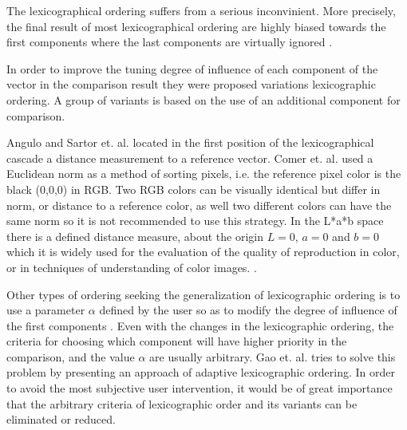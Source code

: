 
The lexicographical ordering suffers from a serious inconvinient. More precisely, the final result of most lexicographical ordering are highly biased towards the first components where the last components are virtually ignored \cite{hanbury2002mathematical3}.
 
In order to improve the tuning degree of influence of each component of the vector in the comparison result they were proposed variations lexicographic ordering. A group of variants is based on the use of an additional component for comparison.

Angulo \cite{angulo2005morphological} and  Sartor et. al. \cite{sartor2001morphological} located in the first position of the lexicographical cascade a distance measurement to a reference vector. Comer et. al. \cite{comer1999morphological} used a Euclidean norm as a method of sorting pixels, i.e. the reference pixel color is the black (0,0,0) in RGB. Two RGB colors can be visually identical but differ in norm, or distance to a reference color, as well two different colors can have the same norm so it is not recommended to use this strategy. In the L*a*b space there is a defined distance measure, about the origin $L=0$, $a=0$ and $b=0$ which it is widely used for the evaluation of the quality of reproduction in color, or in techniques of understanding of color images. \cite{tremeau1998analyse}.   

Other types of ordering seeking the generalization of lexicographic ordering is to use a parameter $\alpha$  defined by the user so as to modify the degree of influence of the first components \cite{ortiz2002procesamiento,angulo2005unified}. Even with the changes in the lexicographic ordering, the criteria for choosing which component will have higher priority in the comparison, and the value $\alpha$ are usually arbitrary. Gao et. al. \cite{gao2013adaptive} tries to solve this problem by presenting an approach of adaptive lexicographic ordering. 
In order to avoid the most subjective user intervention, it would be of great importance that the arbitrary criteria of lexicographic order and its variants can be eliminated or reduced.


